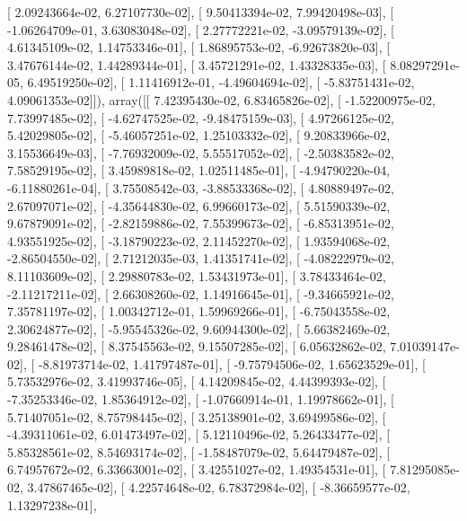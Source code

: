 \documentclass{article}
\begin{document}
       [  2.09243664e-02,   6.27107730e-02],
       [  9.50413394e-02,   7.99420498e-03],
       [ -1.06264709e-01,   3.63083048e-02],
       [  2.27772221e-02,  -3.09579139e-02],
       [  4.61345109e-02,   1.14753346e-01],
       [  1.86895753e-02,  -6.92673820e-03],
       [  3.47676144e-02,   1.44289344e-01],
       [  3.45721291e-02,   1.43328335e-03],
       [  8.08297291e-05,   6.49519250e-02],
       [  1.11416912e-01,  -4.49604694e-02],
       [ -5.83751431e-02,   4.09061353e-02]]), array([[  7.42395430e-02,   6.83465826e-02],
       [ -1.52200975e-02,   7.73997485e-02],
       [ -4.62747525e-02,  -9.48475159e-03],
       [  4.97266125e-02,   5.42029805e-02],
       [ -5.46057251e-02,   1.25103332e-02],
       [  9.20833966e-02,   3.15536649e-03],
       [ -7.76932009e-02,   5.55517052e-02],
       [ -2.50383582e-02,   7.58529195e-02],
       [  3.45989818e-02,   1.02511485e-01],
       [ -4.94790220e-04,  -6.11880261e-04],
       [  3.75508542e-03,  -3.88533368e-02],
       [  4.80889497e-02,   2.67097071e-02],
       [ -4.35644830e-02,   6.99660173e-02],
       [  5.51590339e-02,   9.67879091e-02],
       [ -2.82159886e-02,   7.55399673e-02],
       [ -6.85313951e-02,   4.93551925e-02],
       [ -3.18790223e-02,   2.11452270e-02],
       [  1.93594068e-02,  -2.86504550e-02],
       [  2.71212035e-03,   1.41351741e-02],
       [ -4.08222979e-02,   8.11103609e-02],
       [  2.29880783e-02,   1.53431973e-01],
       [  3.78433464e-02,  -2.11217211e-02],
       [  2.66308260e-02,   1.14916645e-01],
       [ -9.34665921e-02,   7.35781197e-02],
       [  1.00342712e-01,   1.59969266e-01],
       [ -6.75043558e-02,   2.30624877e-02],
       [ -5.95545326e-02,   9.60944300e-02],
       [  5.66382469e-02,   9.28461478e-02],
       [  8.37545563e-02,   9.15507285e-02],
       [  6.05632862e-02,   7.01039147e-02],
       [ -8.81973714e-02,   1.41797487e-01],
       [ -9.75794506e-02,   1.65623529e-01],
       [  5.73532976e-02,   3.41993746e-05],
       [  4.14209845e-02,   4.44399393e-02],
       [ -7.35253346e-02,   1.85364912e-02],
       [ -1.07660914e-01,   1.19978662e-01],
       [  5.71407051e-02,   8.75798445e-02],
       [  3.25138901e-02,   3.69499586e-02],
       [ -4.39311061e-02,   6.01473497e-02],
       [  5.12110496e-02,   5.26433477e-02],
       [  5.85328561e-02,   8.54693174e-02],
       [ -1.58487079e-02,   5.64479487e-02],
       [  6.74957672e-02,   6.33663001e-02],
       [  3.42551027e-02,   1.49354531e-01],
       [  7.81295085e-02,   3.47867465e-02],
       [  4.22574648e-02,   6.78372984e-02],
       [ -8.36659577e-02,   1.13297238e-01],
\end{document}
